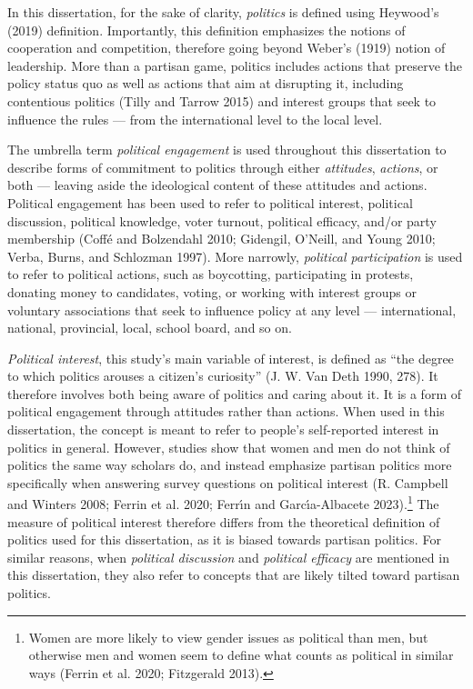 \documentclass[
  letterpaper,
  DIV=11,
  numbers=noendperiod]{scrreprt}
\begin{document}
In this dissertation, for the sake of clarity, \emph{politics} is
defined using Heywood's (2019) definition. Importantly, this definition
emphasizes the notions of cooperation and competition, therefore going
beyond Weber's (1919) notion of leadership. More than a partisan game,
politics includes actions that preserve the policy status quo as well as
actions that aim at disrupting it, including contentious politics (Tilly
and Tarrow 2015) and interest groups that seek to influence the rules
--- from the international level to the local level.

The umbrella term \emph{political engagement} is used throughout this
dissertation to describe forms of commitment to politics through either
\emph{attitudes}, \emph{actions}, or both --- leaving aside the
ideological content of these attitudes and actions. Political engagement
has been used to refer to political interest, political discussion,
political knowledge, voter turnout, political efficacy, and/or party
membership (Coffé and Bolzendahl 2010; Gidengil, O'Neill, and Young
2010; Verba, Burns, and Schlozman 1997). More narrowly, \emph{political
participation} is used to refer to political actions, such as
boycotting, participating in protests, donating money to candidates,
voting, or working with interest groups or voluntary associations that
seek to influence policy at any level --- international, national,
provincial, local, school board, and so on.

\emph{Political interest}, this study's main variable of interest, is
defined as ``the degree to which politics arouses a citizen's
curiosity'' (J. W. Van Deth 1990, 278). It therefore involves both being
aware of politics and caring about it. It is a form of political
engagement through attitudes rather than actions. When used in this
dissertation, the concept is meant to refer to people's self-reported
interest in politics in general. However, studies show that women and
men do not think of politics the same way scholars do, and instead
emphasize partisan politics more specifically when answering survey
questions on political interest (R. Campbell and Winters 2008; Ferrin et
al. 2020; Ferrı́n and Garcı́a-Albacete 2023).\footnote{Women are more
  likely to view gender issues as political than men, but otherwise men
  and women seem to define what counts as political in similar ways
  (Ferrin et al. 2020; Fitzgerald 2013).} The measure of political
interest therefore differs from the theoretical definition of politics
used for this dissertation, as it is biased towards partisan politics.
For similar reasons, when \emph{political discussion} and
\emph{political efficacy} are mentioned in this dissertation, they also
refer to concepts that are likely tilted toward partisan politics.
\end{document}
